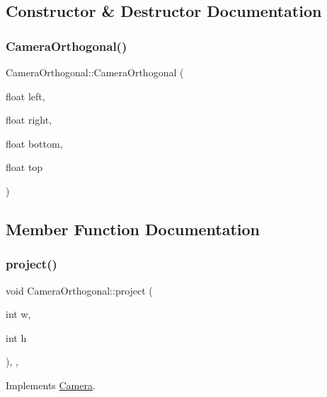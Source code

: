 \subsection{Constructor \& Destructor Documentation}
\mbox{\label{class_camera_orthogonal_aabed9106e5ae8c9661afba065f8cd6ad}} 
\subsubsection{\texorpdfstring{Camera\+Orthogonal()}{CameraOrthogonal()}}
{\footnotesize\ttfamily Camera\+Orthogonal\+::\+Camera\+Orthogonal (\begin{DoxyParamCaption}\item[{float}]{left,  }\item[{float}]{right,  }\item[{float}]{bottom,  }\item[{float}]{top }\end{DoxyParamCaption})\hspace{0.3cm}{\ttfamily [inline]}}



\subsection{Member Function Documentation}
\mbox{\label{class_camera_orthogonal_a593df7d7b84de30d312e31ffed831d9c}} 
\subsubsection{\texorpdfstring{project()}{project()}}
{\footnotesize\ttfamily void Camera\+Orthogonal\+::project (\begin{DoxyParamCaption}\item[{int}]{w,  }\item[{int}]{h }\end{DoxyParamCaption})\hspace{0.3cm}{\ttfamily [inline]}, {\ttfamily [final]}, {\ttfamily [virtual]}}



Implements \hyperlink{class_camera_a5b50ba31455a712ec09561105c12c7c2}{Camera}.

